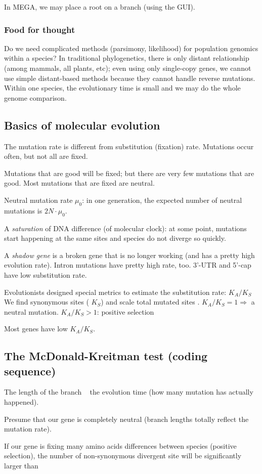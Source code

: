 \documentclass[main.tex]{subfiles}
\begin{document}
In MEGA, we may place a root on a branch (using the GUI).

\subsubsection{Food for thought}

Do we need complicated methods (parsimony, likelihood) for population genomics within a species?
In traditional phylogenetics, there is only distant relationship (among mammals, all plants, etc); even using only single-copy genes, we cannot use simple distant-based methods because they cannot handle reverse mutations.
Within one species, the evolutionary time is small and we may do the whole genome comparison.

\subsection{Basics of molecular evolution}


The mutation rate is different from substitution (fixation) rate.
Mutations occur often, but not all are fixed.

Mutations that are good will be fixed; but there are very few mutations that are good.
Most mutations that are fixed are neutral.

Neutral mutation rate $ \mu_0 $: in one generation, the expected number of neutral mutations is $ 2 N \cdot \mu_0 $.


A \emph{saturation} of DNA difference (of molecular clock): at some point, mutations start happening at the same sites and species do not diverge so quickly.

A \emph{shadow gene} is a broken gene that is no longer working (and has a pretty high evolution rate).
Intron mutations have pretty high rate, too.
3'-UTR and 5'-cap have low substitution rate.

Evolutionists designed special metrics to estimate the substitution rate: $ K_A / K_S $ %
We find synonymous sites ( $ K_S $) and scale total mutated sites .
$ K_A / K_S = 1 \Rightarrow $ a neutral mutation.
$ K_A / K_S > 1 $: positive selection

Most genes have low $ K_A / K_S $.

\subsection{The McDonald-Kreitman test (coding sequence)}

The length of the branch ~ the evolution time (how many mutation has actually happened).

Presume that our gene is completely neutral (branch lengths totally reflect the mutation rate).

If our gene is fixing many amino acids differences between species (positive selection), the number of non-synonymous divergent site will be significantly larger than 
\end{document}
